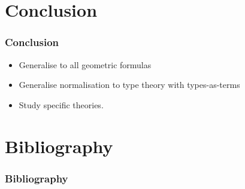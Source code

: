 \documentclass{beamer}
\newcommand{\0}{\boldsymbol{0}}
\newcommand{\1}{\boldsymbol{1}}
\begin{document}
\section{Conclusion}
\begin{frame}
    \frametitle{Conclusion}
    \begin{itemize}
        \item Generalise to all geometric formulas
        \item Generalise normalisation to type theory with types-as-terms
        \item Study specific theories.
    \end{itemize}
\end{frame}
\section{Bibliography}

\begin{frame}[allowframebreaks]
    \frametitle{Bibliography}

    \printbibliography

\end{frame}
\end{document}
